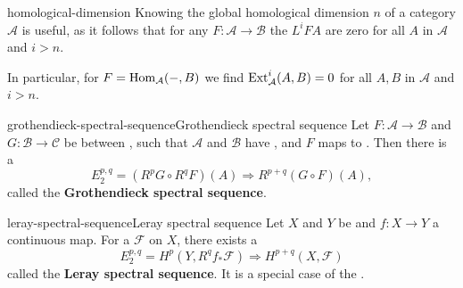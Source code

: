 \begin{example}{homological-dimension}
    Knowing the global homological dimension $n$ of a category $\mathcal{A}$ is useful, as it follows that for any  $F \colon \mathcal{A} \to \mathcal{B}$ the  $L^i F A$ are zero for all $A$ in $\mathcal{A}$ and $i > n$.
    
    In particular, for $F = \operatorname{Hom}_\mathcal{A}(-, B)$ we find $\textup{Ext}_\mathcal{A}^i(A, B) = 0$ for all $A, B$ in $\mathcal{A}$ and $i > n$.
\end{example}

\begin{topic}{grothendieck-spectral-sequence}{Grothendieck spectral sequence}
    Let $F \colon \mathcal{A} \to \mathcal{B}$ and $G \colon \mathcal{B} \to \mathcal{C}$ be  between , such that $\mathcal{A}$ and $\mathcal{B}$ have , and $F$ maps  to . Then there is a 
    \[ E_2^{p, q} = (R^p G \circ R^q F)(A) \Rightarrow R^{p + q}(G \circ F)(A) , \]
    called the \textbf{Grothendieck spectral sequence}.
\end{topic}

\begin{topic}{leray-spectral-sequence}{Leray spectral sequence}
    Let $X$ and $Y$ be  and $f \colon X \to Y$ a continuous map. For a  $\mathcal{F}$ on $X$, there exists a 
    \[ E_2^{p, q} = H^p(Y, R^q f_* \mathcal{F}) \Rightarrow H^{p + q}(X, \mathcal{F}) \]
    called the \textbf{Leray spectral sequence}. It is a special case of the .
\end{topic}

